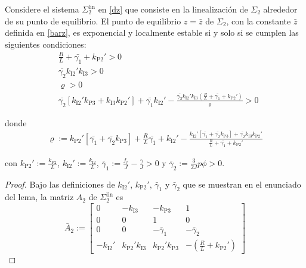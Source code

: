 \begin{lemma}\label{lem:sigma_2}
    Considere el sistema $\Sigma_2^{\mathrm{lin}}$ en \eqref{dz} que consiste en la
    linealización de $\Sigma_2$ alrededor de su punto de equilibrio. El
    punto de equilibrio $z=\bar{z}$ de $\Sigma_2$, con la constante $\bar{z}$
    definida en \eqref{barz}, es exponencial y localmente estable si y
    solo si se cumplen las siguientes condiciones:
    \begin{align}
        & \frac{R}{L} + \bar{\gamma_1} + k_{\textrm{P2}}' > 0 \label{eq:cond1}
        \\
        & \bar{\gamma_2}k_{\textrm{I2}}'k_{\textrm{I3}} > 0 \label{eq:cond2}
        \\
        & \varrho > 0 \label{eq:cond3}
        \\
        & \bar{\gamma_2}\left[k_{\textrm{I2}}'k_{\textrm{P3}} + k_{\textrm{I3}}k_{\textrm{P2}}'\right] + \bar{\gamma_1}k_{\textrm{I2}}'
    - \frac{\bar{\gamma_2}k_{\textrm{I2}}'k_{\textrm{I3}}\left(\frac{R}{L} + \bar{\gamma_1} + k_{\textrm{P2}}'\right)}{\varrho} > 0 \label{eq:cond4}
    \end{align}
    
    donde 
    \begin{align*}
        \varrho := k_{\textrm{P2}}' \left[\bar{\gamma_1} + \bar{\gamma_2}k_{\textrm{P3}}\right] + \frac{R}{L}\bar{\gamma_1} + k_{\textrm{I2}}' 
    - \frac{k_{\textrm{I2}}'\left[\bar{\gamma_1} + \bar{\gamma_2}k_{\textrm{P3}}\right] + \bar{\gamma_2}k_{\textrm{I3}}k_{\textrm{P2}}'}{\frac{R}{L} + \bar{\gamma_1} + k_{\textrm{P2}}'}
    \end{align*}
    
    con $k_{\textrm{P2}}' := \frac{k_{\textrm{P2}}}{L}$, $k_{\textrm{I2}}' := \frac{k_{\textrm{I2}}}{L}$, $\bar{\gamma}_1 := \frac{f_r}{J} - \frac{\gamma}{J} > 0$ y $\bar{\gamma}_2 := \frac{3}{2J}p\phi > 0$.

    \tripletriang
    \begin{proof}
        Bajo las definiciones de $k_{\textrm{I2}}'$, $k_{\textrm{P2}}'$, $\bar{\gamma}_1$ y $\bar{\gamma}_2$ que se muestran en el enunciado del lema, la matriz $A_2$ de $\Sigma_2^{\mathrm{lin}}$ es
        $$\bar{A}_2 := \begin{bmatrix}
            0 & -k_{\textrm{I3}} & -k_{\textrm{P3}} & 1 \\
            0 & 0 & 1 & 0 \\
            0 & 0 & -\bar{\gamma}_1  & -\bar{\gamma}_2 \\
            -k_{\textrm{I2}}' & k_{\textrm{P2}}'k_{\textrm{I3}} & k_{\textrm{P2}}'k_{\textrm{P3}} & -\left(\frac{R}{L}+k_{\textrm{P2}}'\right)
        \end{bmatrix}$$


\end{proof}
\end{lemma}
